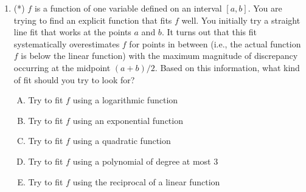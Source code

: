 \documentclass[10pt]{amsart}
\begin{document}
\begin{enumerate}
  \begin{enumerate}[(A)]
  \item Choose the inputs as far as possible from each other, i.e.,
    choose them as $a$ and $b$.
  \item Choose the inputs to be as close to each other as possible,
    i.e., choose them to be nearby points but not equal to each other.
  \item It does not matter. Any choice of two distinct inputs is good
    enough.
  \end{enumerate}

  {\em Answer}: Option (A)

  {\em Explanation}: If the inputs are chosen close together, then
  even small errors in the input can cause large errors in the
  measurement of the slope. The error in slope is the signed
  difference of measurement errors divided by the distance between the
  inputs. The former is beyond our control, because we noted that the
  magnitude and sign of measurement error does not depend on where we
  choose the inputs. Thus, choosing the inputs as far as possible
  brings us a larger denominator, and therefore keeps the slope error
  at a minimum.

  {\em Performance review}: 23 out of 29 got this. 4 chose (B), 2
  chose (C).

  {\em Historical note (last time)}: $11$ out of $29$ got this. $15$ chose (C),
  $3$ chose (B).
\item (*) $f$ is a function of one variable defined on an interval
  $[a,b]$. You are trying to find an explicit function that fits $f$
  well. You initially try a straight line fit that works at the points
  $a$ and $b$. It turns out that this fit systematically overestimates
  $f$ for points in between (i.e., the actual function $f$ is below
  the linear function) with the maximum magnitude of discrepancy
  occurring at the midpoint $(a + b)/2$. Based on this information,
  what kind of fit should you try to look for?

  \begin{enumerate}[(A)]
  \item Try to fit $f$ using a logarithmic function
  \item Try to fit $f$ using an exponential function
  \item Try to fit $f$ using a quadratic function
  \item Try to fit $f$ using a polynomial of degree at most $3$
  \item Try to fit $f$ using the reciprocal of a linear function
  \end{enumerate}


\end{enumerate}
\end{document}
